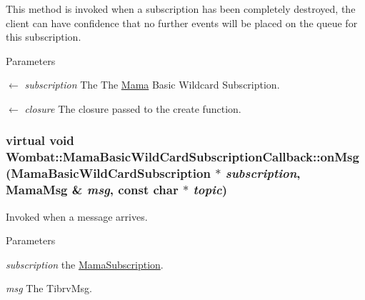 This method is invoked when a subscription has been completely destroyed, the client can have confidence that no further events will be placed on the queue for this subscription. 
\begin{DoxyParams}{Parameters}
\item[\mbox{$\leftarrow$} {\em subscription}]The The \hyperlink{classWombat_1_1Mama}{Mama} Basic Wildcard Subscription. \item[\mbox{$\leftarrow$} {\em closure}]The closure passed to the create function. \end{DoxyParams}
\hypertarget{classWombat_1_1MamaBasicWildCardSubscriptionCallback_aac6e6572d42f3ceb8a354a79a0171cf2}{
\subsubsection[{onMsg}]{\setlength{\rightskip}{0pt plus 5cm}virtual void Wombat::MamaBasicWildCardSubscriptionCallback::onMsg ({\bf MamaBasicWildCardSubscription} $\ast$ {\em subscription}, \/  {\bf MamaMsg} \& {\em msg}, \/  const char $\ast$ {\em topic})}}
\label{classWombat_1_1MamaBasicWildCardSubscriptionCallback_aac6e6572d42f3ceb8a354a79a0171cf2}


Invoked when a message arrives. 
\begin{DoxyParams}{Parameters}
\item[{\em subscription}]the {\ttfamily \hyperlink{classWombat_1_1MamaSubscription}{MamaSubscription}}. \item[{\em msg}]The TibrvMsg. \end{DoxyParams}
